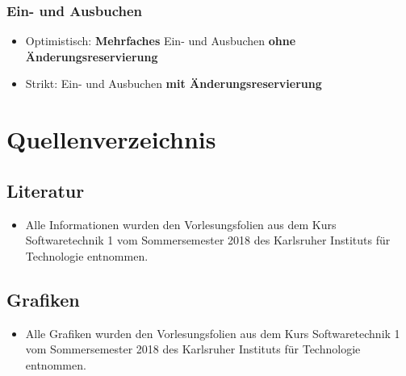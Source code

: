 \documentclass[parskip=full, 12pt]{scrartcl}
\begin{document}
			\subsubsection{Ein- und Ausbuchen}
	
				\begin{itemize}
					\item Optimistisch: \textbf{Mehrfaches} Ein- und Ausbuchen \textbf{ohne Änderungsreservierung}
					\item Strikt: Ein- und Ausbuchen \textbf{mit Änderungsreservierung}
				\end{itemize}
			
	\newpage
	\section{Quellenverzeichnis}
	
		\subsection{Literatur}
	
			\begin{itemize}
				\item Alle Informationen wurden den Vorlesungsfolien aus dem Kurs Softwaretechnik 1 vom Sommersemester 2018 des Karlsruher Instituts für Technologie entnommen.
			\end{itemize}
	
		\subsection{Grafiken}
		
			\begin{itemize}
				\item Alle Grafiken wurden den Vorlesungsfolien aus dem Kurs Softwaretechnik 1 vom Sommersemester 2018 des Karlsruher Instituts für Technologie entnommen.
			\end{itemize}
		
\end{document}
